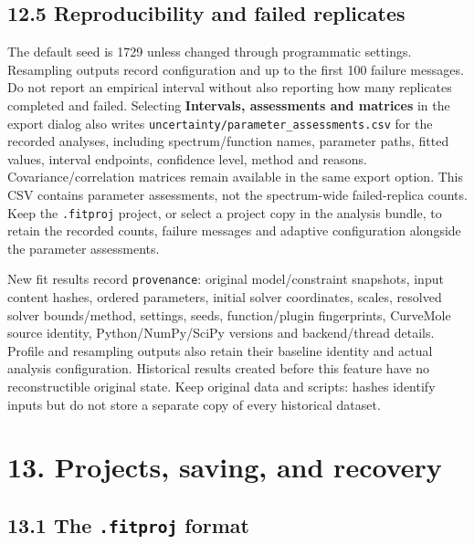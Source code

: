 \documentclass[
  10pt,
  a4paper,
  oneside]{scrreprt}
\begin{document}
\hypertarget{reproducibility-and-failed-replicates}{%
\section{12.5 Reproducibility and failed
replicates}\label{reproducibility-and-failed-replicates}}

The default seed is 1729 unless changed through programmatic settings.
Resampling outputs record configuration and up to the first 100 failure
messages. Do not report an empirical interval without also reporting how
many replicates completed and failed. Selecting \textbf{Intervals,
assessments and matrices} in the export dialog also writes
\texttt{uncertainty/parameter\_assessments.csv} for the recorded
analyses, including spectrum/function names, parameter paths, fitted
values, interval endpoints, confidence level, method and reasons.
Covariance/correlation matrices remain available in the same export
option. This CSV contains parameter assessments, not the spectrum-wide
failed-replica counts. Keep the \texttt{.fitproj} project, or select a
project copy in the analysis bundle, to retain the recorded counts,
failure messages and adaptive configuration alongside the parameter
assessments.

New fit results record \texttt{provenance}: original model/constraint
snapshots, input content hashes, ordered parameters, initial solver
coordinates, scales, resolved solver bounds/method, settings, seeds,
function/plugin fingerprints, CurveMole source identity,
Python/NumPy/SciPy versions and backend/thread details. Profile and
resampling outputs also retain their baseline identity and actual
analysis configuration. Historical results created before this feature
have no reconstructible original state. Keep original data and scripts:
hashes identify inputs but do not store a separate copy of every
historical dataset.

\hypertarget{projects-saving-and-recovery}{%
\chapter{13. Projects, saving, and
recovery}\label{projects-saving-and-recovery}}

\hypertarget{the-.fitproj-format}{%
\section{\texorpdfstring{13.1 The \texttt{.fitproj}
format}{13.1 The .fitproj format}}\label{the-.fitproj-format}}
\end{document}

